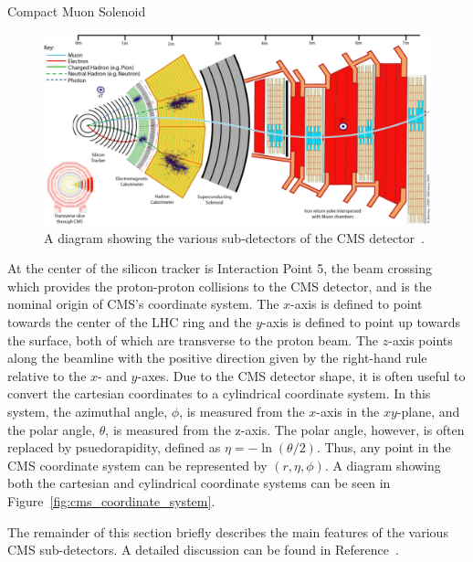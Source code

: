 \begin{section}{Compact Muon Solenoid}
\begin{figure}[tbp!]
\begin{center}
\includegraphics[angle=0,width=0.90\columnwidth]{fig/cms_slice.jpg}
\end{center}
\caption{A diagram showing the various sub-detectors of the CMS detector~\cite{10.1088/978-1-6817-4078-2ch4}.}
\label{fig:cms_slice}
\end{figure}

At the center of the silicon tracker is Interaction Point 5, the beam crossing which provides the proton-proton collisions to the CMS detector, and is the nominal origin of CMS's coordinate system.
The $x$-axis is defined to point towards the center of the LHC ring and the $y$-axis is defined to point up towards the surface, both of which are transverse to the proton beam. 
The $z$-axis points along the beamline with the positive direction given by the right-hand rule relative to the $x$- and $y$-axes.
Due to the CMS detector shape, it is often useful to convert the cartesian coordinates to a cylindrical coordinate system.
In this system, the azimuthal angle, $\phi$, is measured from the $x$-axis in the $xy$-plane, and the polar angle, $\theta$, is measured from the z-axis.
The polar angle, however, is often replaced by psuedorapidity, defined as $\eta = -\ln(\theta/2)$.
Thus, any point in the CMS coordinate system can be represented by $(r, \eta, \phi)$.
A diagram showing both the cartesian and cylindrical coordinate systems can be seen in Figure~\ref{fig:cms_coordinate_system}.

The remainder of this section briefly describes the main features of the various CMS sub-detectors.
A detailed discussion can be found in Reference~\cite{Chatrchyan:2008aa}.


\end{section}
